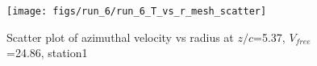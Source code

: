 \begin{figure}[H]
\centering
\texttt{[image: figs/run\_6/run\_6\_T\_vs\_r\_mesh\_scatter]}
\caption{Scatter plot of azimuthal velocity vs radius at $z/c$=5.37, $V_{free}$=24.86, station1}
\label{fig:run_6_T_vs_r_mesh_scatter}
\end{figure}


